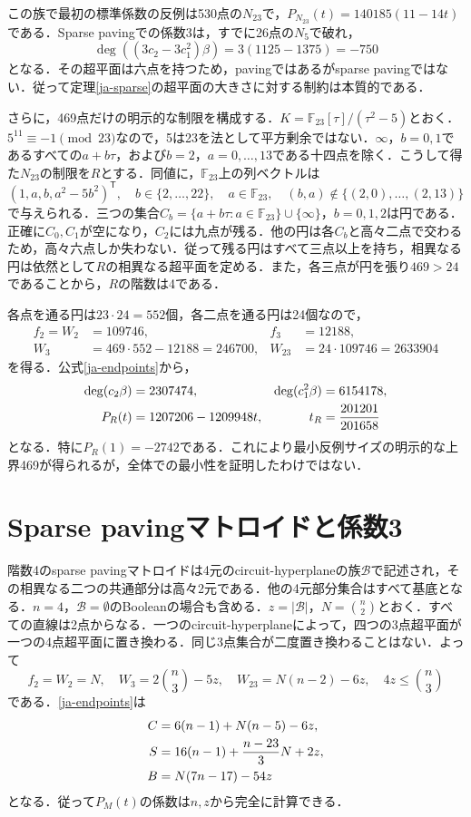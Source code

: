 \documentclass[12pt]{amsart}
\theoremstyle{definition}
\theoremstyle{remark}
\numberwithin{equation}{section}
\begin{document}
この族で最初の標準係数の反例は530点の$N_{23}$で，$P_{N_{23}}(t)=140185(11-14t)$である．Sparse pavingでの係数3は，すでに26点の$N_5$で破れ，
\[
 \deg((3c_2-3c_1^2)\beta)=3(1125-1375)=-750
\]
となる．その超平面は六点を持つため，pavingではあるがsparse pavingではない．従って定理\ref{ja-sparse}の超平面の大きさに対する制約は本質的である．

さらに，469点だけの明示的な制限を構成する．$K=\mathbb F_{23}[\tau]/(\tau^2-5)$とおく．$5^{11}\equiv-1\pmod{23}$なので，5は23を法として平方剰余ではない．$\infty$，$b=0,1$であるすべての$a+b\tau$，および$b=2$，$a=0,\ldots,13$である十四点を除く．こうして得た$N_{23}$の制限を$R$とする．同値に，$\mathbb F_{23}$上の列ベクトルは
\begin{equation}\label{ja-small-columns}
 (1,a,b,a^2-5b^2)^{\mathsf T},\quad
 b\in\{2,\ldots,22\},\quad a\in\mathbb F_{23},\quad
 (b,a)\notin\{(2,0),\ldots,(2,13)\}
\end{equation}
で与えられる．三つの集合$C_b=\{a+b\tau:a\in\mathbb F_{23}\}\cup\{\infty\}$，$b=0,1,2$は円である．正確に$C_0,C_1$が空になり，$C_2$には九点が残る．他の円は各$C_b$と高々二点で交わるため，高々六点しか失わない．従って残る円はすべて三点以上を持ち，相異なる円は依然として$R$の相異なる超平面を定める．また，各三点が円を張り$469>24$であることから，$R$の階数は4である．

各点を通る円は$23\cdot24=552$個，各二点を通る円は24個なので，
\begin{align*}
 f_2=W_2&=109746,& f_3&=12188,\\
 W_3&=469\cdot552-12188=246700,& W_{23}&=24\cdot109746=2633904
\end{align*}
を得る．公式\eqref{ja-endpoints}から，
\begin{align}\label{ja-small-counter}
 \deg(c_2\beta)&=2307474,& \deg(c_1^2\beta)&=6154178,\notag\\
 P_R(t)&=1207206-1209948t,& t_R&=\frac{201201}{201658}
\end{align}
となる．特に$P_R(1)=-2742$である．これにより最小反例サイズの明示的な上界469が得られるが，全体での最小性を証明したわけではない．

\section{Sparse pavingマトロイドと係数3}
階数4のsparse pavingマトロイドは4元のcircuit-hyperplaneの族$\mathcal B$で記述され，その相異なる二つの共通部分は高々2元である．他の4元部分集合はすべて基底となる．$n=4$，$\mathcal B=\emptyset$のBooleanの場合も含める．$z=|\mathcal B|$，$N=\binom n2$とおく．すべての直線は2点からなる．一つのcircuit-hyperplaneによって，四つの3点超平面が一つの4点超平面に置き換わる．同じ3点集合が二度置き換わることはない．よって
\begin{equation}\label{ja-spcounts}
 f_2=W_2=N,\quad W_3=2\binom n3-5z,\quad
 W_{23}=N(n-2)-6z,\quad 4z\leq\binom n3
\end{equation}
である．\eqref{ja-endpoints}は
\begin{align}\label{ja-spchern}
 C&=6(n-1)+N(n-5)-6z,\notag\\
 S&=16(n-1)+\frac{n-23}{3}N+2z,\\
 B&=N(7n-17)-54z\notag
\end{align}
となる．従って$P_M(t)$の係数は$n,z$から完全に計算できる．
\end{document}
